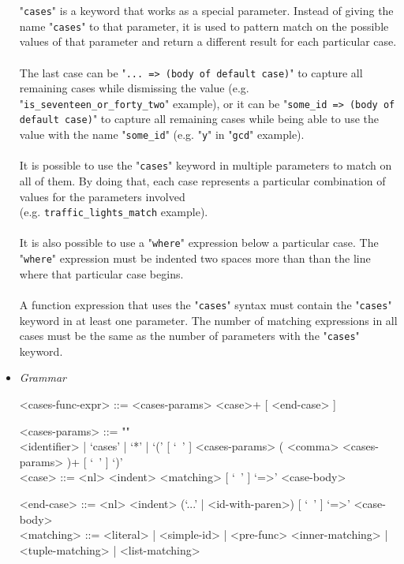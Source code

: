 \documentclass{article}
\begin{document}
\begin{itemize}
"\verb|cases|" is a keyword that works as a special parameter.  Instead of
giving the name "\verb|cases|" to that parameter, it is used to pattern match
on the possible values of that parameter and return a different result for each
particular case. 
\\\\
The last case can be "\verb|... => (body of default case)|" to capture all
remaining cases while dismissing the value (e.g.
"\verb|is_seventeen_or_forty_two|" example), or it can be
"\verb|some_id => (body of default case)|" to capture all remaining
cases while being able to use the value with the name "\verb|some_id|"
(e.g.  "\verb|y|" in "\verb|gcd|" example).
\\\\
It is possible to use the "\verb|cases|" keyword in multiple parameters to match on
all of them. By doing that, each case represents a particular combination of
values for the parameters involved\\(e.g. \verb|traffic_lights_match|
example).
\\\\
It is also possible to use a "\verb|where|" expression below a particular case.
The "\verb|where|" expression must be indented two spaces more than than the
line where that particular case begins.
\\\\
A function expression that uses the "\verb|cases|" syntax must contain the
"\verb|cases|" keyword in at least one parameter. The number of matching
expressions in all cases must be the same as the number of parameters with the
"\verb|cases|" keyword.

\item \textit{Grammar}
\begin{grammar}
<cases-func-expr> ::= <cases-params> <case>+ [ <end-case> ]

<cases-params> ::=
""\\
<identifier> | `cases' | `*' |
`(' [ `\ ' ] <cases-params> ( <comma> <cases-params> )+ [ `\ ' ] `)'
\\

<case> ::=  <nl> <indent> <matching> [ `\ ' ] `=>' <case-body>

<end-case> ::=
<nl> <indent> (`...' | <id-with-paren>) [ `\ ' ] `=>' <case-body>
\\

<matching> ::= 
<literal> | <simple-id> | <pre-func> <inner-matching> | <tuple-matching> |
<list-matching>


\end{grammar}
\end{itemize}
\end{document}
